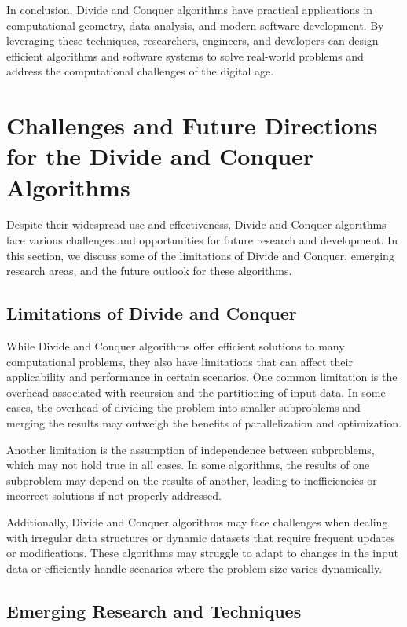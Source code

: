 \documentclass[12pt]{book} %
\begin{document}
In conclusion, Divide and Conquer algorithms have practical applications in computational geometry, data analysis, and modern software development. By leveraging these techniques, researchers, engineers, and developers can design efficient algorithms and software systems to solve real-world problems and address the computational challenges of the digital age.

\section{Challenges and Future Directions for the Divide and Conquer Algorithms}

Despite their widespread use and effectiveness, Divide and Conquer algorithms face various challenges and opportunities for future research and development. In this section, we discuss some of the limitations of Divide and Conquer, emerging research areas, and the future outlook for these algorithms.

\subsection{Limitations of Divide and Conquer}

While Divide and Conquer algorithms offer efficient solutions to many computational problems, they also have limitations that can affect their applicability and performance in certain scenarios. One common limitation is the overhead associated with recursion and the partitioning of input data. In some cases, the overhead of dividing the problem into smaller subproblems and merging the results may outweigh the benefits of parallelization and optimization.

Another limitation is the assumption of independence between subproblems, which may not hold true in all cases. In some algorithms, the results of one subproblem may depend on the results of another, leading to inefficiencies or incorrect solutions if not properly addressed.

Additionally, Divide and Conquer algorithms may face challenges when dealing with irregular data structures or dynamic datasets that require frequent updates or modifications. These algorithms may struggle to adapt to changes in the input data or efficiently handle scenarios where the problem size varies dynamically.

\subsection{Emerging Research and Techniques}
\end{document}
